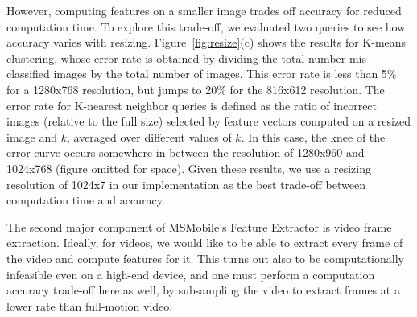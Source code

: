However, computing features on a smaller image trades off accuracy for
reduced computation time.
%
To explore this trade-off, we evaluated two queries to see how
accuracy varies with resizing.
%
Figure~\ref{fig:resize}(c) shows the results for K-means clustering,
whose error rate is obtained by dividing the total number
mis-classified images by the total number of images.
%
This error rate is less than 5\% for a 1280x768 resolution, but jumps
to 20\% for the 816x612 resolution.
%
The error rate for K-nearest neighbor queries is defined as the
ratio of incorrect images (relative to the full size) selected by
feature vectors computed on a resized image and $k$, averaged over
different values of $k$.
%
In this case, the knee of the error curve occurs somewhere in between
the resolution of 1280x960 and 1024x768 (figure omitted for space).
Given these results, we use a resizing resolution of 1024x7 in our
implementation as the best trade-off between computation time and
accuracy.

%
The second major component of MSMobile's Feature Extractor is video
frame extraction.
%
Ideally, for videos, we would like to be able to extract every frame
of the video and compute features for it.
%
This turns out also to be computationally infeasible even on a
high-end device, and one must perform a computation accuracy trade-off
here as well, by subsampling the video to extract frames at a lower
rate than full-motion video.
%

%
%
%
%
%
%


